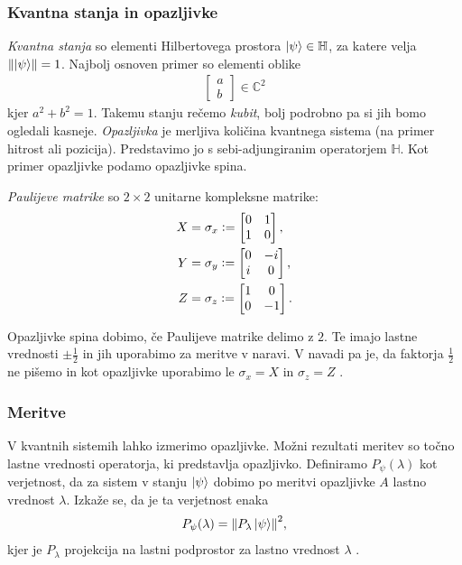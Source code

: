 \documentclass[mat1]{fmfdelo}
\newcommand{\C}{\mathbb C}
\newcommand{\Hb}{\mathbb H}
\newcommand{\defeq}{\vcentcolon=}
\begin{document}
\subsubsection{Kvantna stanja in opazljivke}
\emph{Kvantna stanja} so elementi Hilbertovega prostora \(\ket\psi\in\Hb\), za katere velja \(\norm{\ket\psi} = 1\). Najbolj osnoven primer so elementi oblike 
\begin{align*}
    \begin{bmatrix}a\\b\end{bmatrix} \in \C^2
\end{align*}
kjer \(a^2 + b^2 = 1\). Takemu stanju rečemo \emph{kubit}, bolj podrobno pa si jih bomo ogledali kasneje. \emph{Opazljivka} je merljiva količina kvantnega sistema (na primer hitrost ali pozicija). Predstavimo jo s sebi-adjungiranim operatorjem \(\Hb\). Kot primer opazljivke podamo opazljivke spina.
\begin{definicija} \label{Pauli} \emph{Paulijeve matrike} so \(2\times 2\) unitarne kompleksne matrike:
    \begin{align*}
        X &= \sigma_x \defeq \begin{bmatrix}
            0&1\\
            1&0
        \end{bmatrix},\\
        Y &= \sigma_y \defeq \begin{bmatrix}
            0&-i\\
            i&0
        \end{bmatrix},\\
        Z &= \sigma_z \defeq \begin{bmatrix}
            1&0\\
            0&-1
        \end{bmatrix}.
    \end{align*}
\end{definicija}
Opazljivke spina dobimo, če Paulijeve matrike delimo z \(2\). Te imajo lastne vrednosti \(\pm \frac12\) in jih uporabimo za meritve v naravi. V navadi pa je, da faktorja \(\frac12\) ne pišemo in kot opazljivke uporabimo le \(\sigma_x = X\) in \(\sigma_z = Z\) \cite[Definicija 2.21]{mathforqm}.
\subsubsection{Meritve}
V kvantnih sistemih lahko izmerimo opazljivke. Možni rezultati meritev so točno lastne vrednosti operatorja, ki predstavlja opazljivko. Definiramo \(P_\psi(\lambda)\) kot verjetnost, da za sistem v stanju \(\ket\psi\) dobimo po meritvi opazljivke \(A\) lastno vrednost \(\lambda\). Izkaže se, da je ta verjetnost enaka 
\begin{align*}
    P_\psi(\lambda) = \norm{P_\lambda \ket\psi}^2,
\end{align*}
kjer je \(P_\lambda\) projekcija na lastni podprostor za lastno vrednost \(\lambda\) \cite[Poglavje 2.3.1]{mathforqm}.
\end{document}
